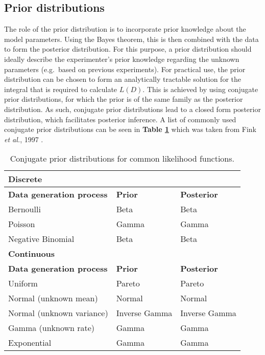 \newpage

\subsection{Prior distributions}
\label{sec0:prior}

The role of the prior distribution is to incorporate prior knowledge about the model parameters. Using the Bayes theorem, this is then combined with the data to form the posterior distribution. For this purpose, a prior distribution should ideally describe the experimenter's prior knowledge regarding the unknown parameters (e.g.~based on previous experiments). For practical use, the prior distribution can be chosen to form an analytically tractable solution for the integral that is required to calculate $L(D)$. This is achieved by using conjugate prior distributions, for which the prior is of the same family as the posterior distribution. As such, conjugate prior distributions lead to a closed form posterior distribution, which facilitates posterior inference. A list of commonly used conjugate prior distributions can be seen in \textbf{Table \ref{tab0:priors}} which was taken from Fink \emph{et al.}, 1997 \citep{Fink1997}.

\begin{table}[hb	]
\centering
\caption[Conjugate prior distributions for common likelihood functions]{Conjugate prior distributions for common likelihood functions.}
\label{tab0:priors}
\begin{tabular}{l l l}
\toprule
\textbf{Discrete} & &\\
\midrule
\midrule
\textbf{Data generation process} & \textbf{Prior} & \textbf{Posterior} \\ 
\midrule 
Bernoulli & Beta & Beta \\
Poisson & Gamma  & Gamma \\
Negative Binomial & Beta & Beta \\
\midrule
\midrule
\textbf{Continuous} & & \\
\midrule
\midrule
\textbf{Data generation process} & \textbf{Prior} & \textbf{Posterior} \\ 
\midrule
Uniform  & Pareto & Pareto \\ 
Normal (unknown mean) &  Normal  & Normal \\ 
Normal (unknown variance) &  Inverse Gamma  & Inverse Gamma \\ 
Gamma (unknown rate) &  Gamma  & Gamma \\ 
Exponential &  Gamma  & Gamma \\ 
\bottomrule
\end{tabular}
\end{table} 

